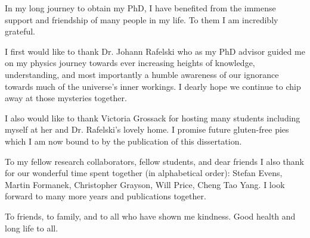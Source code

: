
In my long journey to obtain my PhD, I have benefited from the immense support and friendship of many people in my life. To them I am incredibly grateful.

I first would like to thank Dr. Johann Rafelski who as my PhD advisor guided me on my physics journey towards ever increasing heights of knowledge, understanding, and most importantly a humble awareness of our ignorance towards much of the universe's inner workings. I dearly hope we continue to chip away at those mysteries together.

I also would like to thank Victoria Grossack for hosting many students including myself at her and Dr. Rafelski's lovely home. I promise future gluten-free pies which I am now bound to by the publication of this dissertation.

To my fellow research collaborators, fellow students, and dear friends I also thank for our wonderful time spent together (in alphabetical order): Stefan Evens, Martin Formanek, Christopher Grayson, Will Price, Cheng Tao Yang. I look forward to many more years and publications together.

To friends, to family, and to all who have shown me kindness. Good health and long life to all.